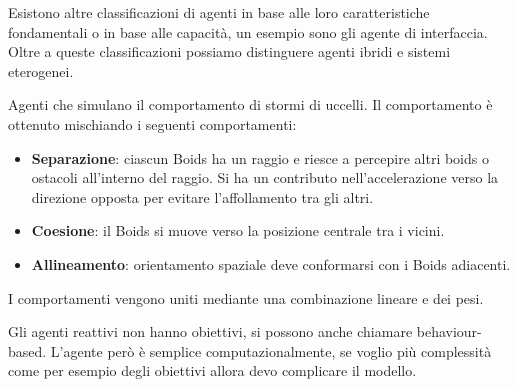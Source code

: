 Esistono altre classificazioni di agenti in base alle loro caratteristiche
fondamentali o in base alle capacità, un esempio sono gli agente di interfaccia.
Oltre a queste classificazioni possiamo distinguere agenti ibridi e sistemi
eterogenei.
\begin{esempio}
    Agenti che simulano il comportamento di stormi di uccelli. Il comportamento
    è ottenuto mischiando i seguenti comportamenti:
    \begin{itemize}
        \item \textbf{Separazione}: ciascun Boids ha un raggio e riesce a percepire
              altri boids o ostacoli all'interno del raggio. Si ha un contributo
              nell'accelerazione verso la direzione opposta per evitare
              l'affollamento tra gli altri.
        \item \textbf{Coesione}: il Boids si muove verso la posizione centrale
              tra i vicini.
        \item \textbf{Allineamento}: orientamento spaziale deve conformarsi con
              i Boids adiacenti.
    \end{itemize}
    I comportamenti vengono uniti mediante una combinazione lineare e dei pesi.
\end{esempio}
Gli agenti reattivi non hanno obiettivi, si possono anche chiamare behaviour-based.
L'agente però è semplice computazionalmente, se voglio più complessità come per
esempio degli obiettivi allora devo complicare il modello.
